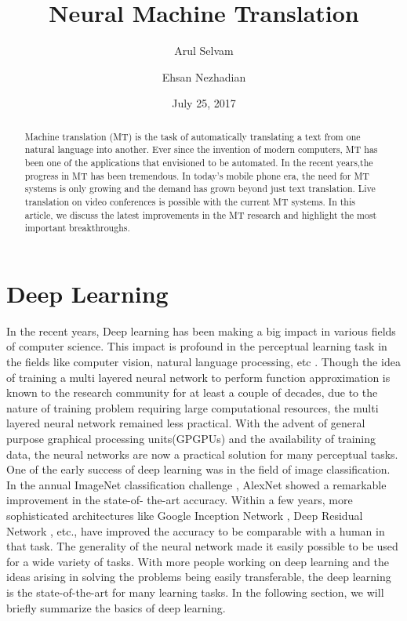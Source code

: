 \documentclass[a4paper]{article}
\begin{document}
\title{Neural Machine Translation}
\author{Arul Selvam}
\author{Ehsan Nezhadian}
\date{July 25, 2017}
\maketitle


\begin{abstract}
Machine translation (MT) is the task of automatically  translating  a  text from
one natural language into another. Ever since the invention of modern computers,
MT  has been  one of the  applications that envisioned  to be automated. In  the
recent years,the  progress in  MT has been  tremendous. In  today's mobile phone
era,  the need for MT systems is only  growing and  the demand  has grown beyond
just text  translation.  Live translation on video conferences  is possible with
the current MT systems. In this article, we discuss the  latest improvements  in
the MT research and highlight the most important breakthroughs.

\end{abstract}


\section{Deep Learning}
In the recent  years,  Deep  learning has  been making a big  impact  in various
fields of computer science. This impact is profound  in  the perceptual learning
task  in  the  fields like computer vision, natural  language  processing,  etc
\cite{lecun2015deep}. Though the idea of training a multi layered neural network
to perform function  approximation  is  known to the research community  for  at
least  a couple  of  decades\cite{schmidhuber2015deep},  due  to the  nature  of
training  problem  requiring  large computational  resources, the multi  layered
neural  network remained  less  practical. With the  advent  of general  purpose
graphical  processing units(GPGPUs) and  the availability  of training data, the
neural  networks  are now a practical solution for many perceptual tasks. One of
the early success of deep learning was in  the field of image classification. In
the  annual ImageNet classification  challenge \cite{deng2009imagenet},  AlexNet
\cite{krizhevsky2012imagenet} showed a  remarkable improvement  in the state-of-
the-art  accuracy.  Within  a  few years, more sophisticated  architectures like
Google  Inception  Network \cite{szegedy2016rethinking},  Deep  Residual Network
\cite{he2016deep}, etc., have improved the accuracy to be comparable with a human
in that task. The generality of the neural network made it easily possible to be
used for a wide variety of tasks. With more people  working on deep learning and
the ideas arising in solving the problems being easily transferable, the deep
learning  is the  state-of-the-art for  many learning  tasks. In  the  following
section, we will briefly summarize the basics of deep learning.
\end{document}
